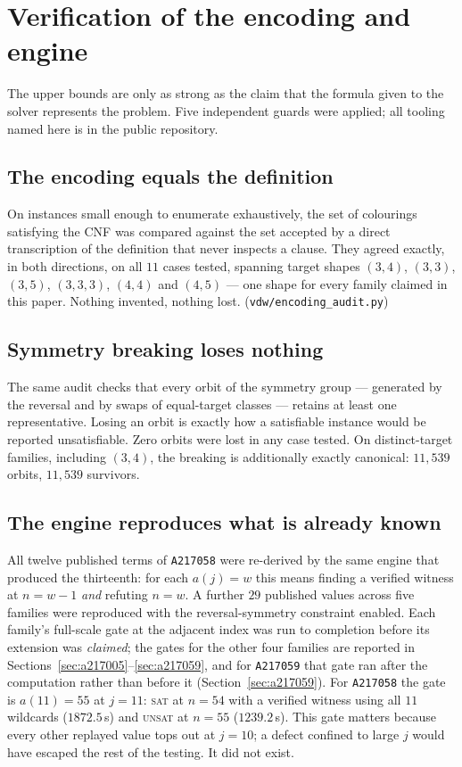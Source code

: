 \documentclass[12pt]{article}
\theoremstyle{remark}
\newcommand{\seq}[1]{\texttt{#1}}
\begin{document}
\section{Verification of the encoding and engine}\label{sec:verification}

The upper bounds are only as strong as the claim that the formula given to
the solver represents the problem. Five independent guards were applied; all
tooling named here is in the public repository.

\subsection{The encoding equals the definition}

On instances small enough to enumerate exhaustively, the set of colourings
satisfying the CNF was compared against the set accepted by a direct
transcription of the definition that never inspects a clause. They agreed
exactly, in both directions, on all $11$ cases tested, spanning target shapes
$(3,4)$, $(3,3)$, $(3,5)$, $(3,3,3)$, $(4,4)$ and $(4,5)$ --- one shape for
every family claimed in this paper. Nothing invented, nothing lost.
(\texttt{vdw/encoding\_audit.py})

\subsection{Symmetry breaking loses nothing}

The same audit checks that every orbit of the symmetry group --- generated by
the reversal and by swaps of equal-target classes --- retains at least one
representative. Losing an orbit is exactly how a satisfiable instance would
be reported unsatisfiable. Zero orbits were lost in any case tested. On
distinct-target families, including $(3,4)$, the breaking is additionally
exactly canonical: $11{,}539$ orbits, $11{,}539$ survivors.

\subsection{The engine reproduces what is already known}

All twelve published terms of \seq{A217058} were re-derived by the same
engine that produced the thirteenth: for each $a(j)=w$ this means finding a
verified witness at $n=w-1$ \emph{and} refuting $n=w$. A further $29$
published values across five families were reproduced with the
reversal-symmetry constraint enabled. Each family's full-scale gate at the
adjacent index was run to completion before its extension was
\emph{claimed}; the gates for the other four families are reported in
Sections~\ref{sec:a217005}--\ref{sec:a217059}, and for \seq{A217059} that
gate ran after the computation rather than before it
(Section~\ref{sec:a217059}). For \seq{A217058} the gate
is $a(11)=55$ at $j=11$: \textsc{sat} at $n=54$ with a verified witness
using all $11$ wildcards ($1872.5$\,s) and \textsc{unsat} at $n=55$
($1239.2$\,s). This gate matters because every other replayed value tops out
at $j=10$; a defect confined to large $j$ would have escaped the rest of the
testing. It did not exist.
\end{document}
